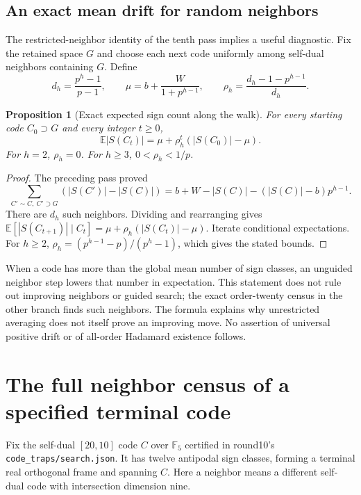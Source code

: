 \documentclass[11pt]{article}
\newtheorem{proposition}[theorem]{Proposition}
\begin{document}
\subsection{An exact mean drift for random neighbors}
The restricted-neighbor identity of the tenth pass implies a useful
diagnostic. Fix the retained space $G$ and choose each next code
uniformly among self-dual neighbors containing $G$. Define
\[
 d_h=\frac{p^h-1}{p-1},\qquad
 \mu=b+\frac{W}{1+p^{h-1}},\qquad
 \rho_h=\frac{d_h-1-p^{h-1}}{d_h}.
\]
\begin{proposition}[Exact expected sign count along the walk]
For every starting code $C_0\supset G$ and every integer $t\ge0$,
\[
 \mathbb E |S(C_t)|=\mu+\rho_h^t(|S(C_0)|-\mu).
\]
For $h=2$, $\rho_h=0$. For $h\ge3$, $0<\rho_h<1/p$.
\end{proposition}
\begin{proof}
The preceding pass proved
\[
 \sum_{C'\sim C,\ C'\supset G}(|S(C')|-|S(C)|)
 =b+W-|S(C)|-(|S(C)|-b)p^{h-1}.
\]
There are $d_h$ such neighbors. Dividing and rearranging gives
$\mathbb E[|S(C_{t+1})|\mid C_t]
=\mu+\rho_h(|S(C_t)|-\mu)$. Iterate conditional expectations.
For $h\ge2$,
$\rho_h=(p^{h-1}-p)/(p^h-1)$, which gives the stated bounds.
\end{proof}

When a code has more than the global mean number of sign classes,
an unguided neighbor step lowers that number in expectation.
This statement does not rule out improving neighbors or guided
search; the exact order-twenty census in the other branch finds
such neighbors. The formula explains why unrestricted averaging
does not itself prove an improving move. No assertion of universal
positive drift or of all-order Hadamard existence follows.

\section{The full neighbor census of a specified terminal code}

Fix the self-dual $[20,10]$ code $C$ over $\mathbb F_5$ certified in
round10's \texttt{code\_traps/search.json}. It has twelve antipodal
sign classes, forming a terminal real orthogonal frame and spanning
$C$. Here a neighbor means a different self-dual code with
intersection dimension nine.
\end{document}
